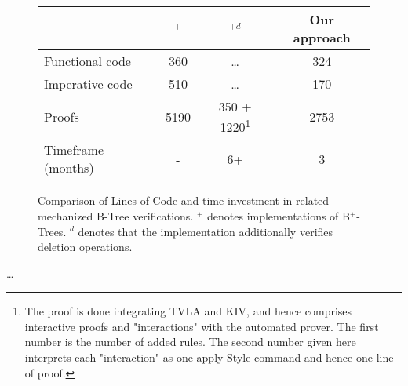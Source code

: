 \begin{figure}
    \centering
    \begin{tabular}{l|c|c|c}
        \                & \parencite{DBLP:conf/popl/MalechaMSW10}$^{+}$ & \parencite{DBLP:journals/sosym/ErnstSR15}$^{+d}$ & Our approach \\
        \hline
        Functional code &   360      & \dots                 & 324  \\
        Imperative code &   510      & \dots                 & 170  \\
        Proofs          &  5190      & 350 + 1220\footnote{
            The proof is done integrating TVLA and KIV, and hence comprises
            interactive proofs and "interactions" with the automated prover.
            The first number is the number of added rules.
            The second number given here interprets each "interaction" as one apply-Style
            command and hence one line of proof.
        } & 2753 \\
        Timeframe (months) &  -     & 6+                      & 3   \\
    \end{tabular}
    \caption{Comparison of Lines of Code and time investment in related mechanized B-Tree verifications.
    $^+$ denotes implementations of B$^+$-Trees.
    $^d$ denotes that the implementation additionally verifies deletion operations.
    }
    \label{fig:proof-comparison}
\end{figure}

\dots